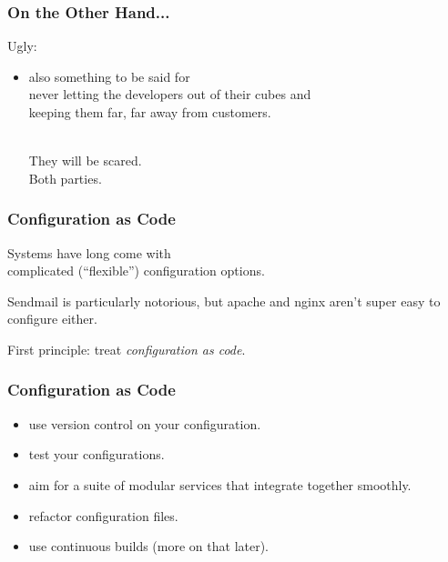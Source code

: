 \begin{frame}
\frametitle{On the Other Hand...}

\large
\begin{changemargin}{1cm}
Ugly:
\begin{itemize}
\item also something to be said for \\
never letting the developers out of their cubes and \\
keeping them far, far away from  customers. \\\

They will be scared. \\

Both parties.
\end{itemize}
\end{changemargin}
\end{frame}



\begin{frame}
\frametitle{Configuration as Code}

\large
\begin{changemargin}{2cm}
Systems have long come with \\
complicated (``flexible'') configuration options.


Sendmail is particularly notorious, but apache and nginx aren't super
easy to configure either.

First principle: treat \emph{configuration as code}.
\end{changemargin}

\end{frame}



\begin{frame}
\frametitle{Configuration as Code}

\large
\begin{changemargin}{2cm}
\begin{itemize}
\item use version control on your configuration.
\item test your configurations.
\item aim for a suite of modular services that integrate together smoothly.
\item refactor configuration files.
\item use continuous builds (more on that later).
\end{itemize}
\end{changemargin}

\end{frame}



